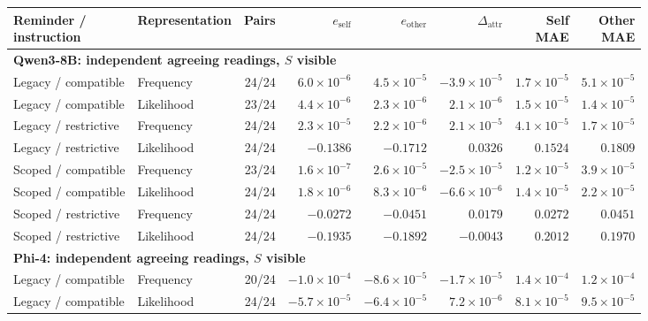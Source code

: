 \begin{table}[t]
\centering
{\small\setlength{\tabcolsep}{4pt}
\begin{tabular*}{\textwidth}{@{\extracolsep{\fill}}llrrrrrr@{}}
\toprule
\shortstack[l]{Reminder /\\instruction} & Representation & Pairs & $e_{\mathrm{self}}$ & $e_{\mathrm{other}}$ & $\Delta_{\mathrm{attr}}$ & \shortstack{Self\\MAE} & \shortstack{Other\\MAE} \\
\midrule
\multicolumn{8}{l}{\textbf{Qwen3-8B: independent agreeing readings, $S$ visible}} \\
\midrule
Legacy / compatible & Frequency & 24/24 & $6.0\times10^{-6}$ & $4.5\times10^{-5}$ & $-3.9\times10^{-5}$ & $1.7\times10^{-5}$ & $5.1\times10^{-5}$ \\
Legacy / compatible & Likelihood & 23/24 & $4.4\times10^{-6}$ & $2.3\times10^{-6}$ & $2.1\times10^{-6}$ & $1.5\times10^{-5}$ & $1.4\times10^{-5}$ \\
Legacy / restrictive & Frequency & 24/24 & $2.3\times10^{-5}$ & $2.2\times10^{-6}$ & $2.1\times10^{-5}$ & $4.1\times10^{-5}$ & $1.7\times10^{-5}$ \\
Legacy / restrictive & Likelihood & 24/24 & $-0.1386$ & $-0.1712$ & $0.0326$ & $0.1524$ & $0.1809$ \\
Scoped / compatible & Frequency & 23/24 & $1.6\times10^{-7}$ & $2.6\times10^{-5}$ & $-2.5\times10^{-5}$ & $1.2\times10^{-5}$ & $3.9\times10^{-5}$ \\
Scoped / compatible & Likelihood & 24/24 & $1.8\times10^{-6}$ & $8.3\times10^{-6}$ & $-6.6\times10^{-6}$ & $1.4\times10^{-5}$ & $2.2\times10^{-5}$ \\
Scoped / restrictive & Frequency & 24/24 & $-0.0272$ & $-0.0451$ & $0.0179$ & $0.0272$ & $0.0451$ \\
Scoped / restrictive & Likelihood & 24/24 & $-0.1935$ & $-0.1892$ & $-0.0043$ & $0.2012$ & $0.1970$ \\
\midrule
\multicolumn{8}{l}{\textbf{Phi-4: independent agreeing readings, $S$ visible}} \\
\midrule
Legacy / compatible & Frequency & 20/24 & $-1.0\times10^{-4}$ & $-8.6\times10^{-5}$ & $-1.7\times10^{-5}$ & $1.4\times10^{-4}$ & $1.2\times10^{-4}$ \\
Legacy / compatible & Likelihood & 24/24 & $-5.7\times10^{-5}$ & $-6.4\times10^{-5}$ & $7.2\times10^{-6}$ & $8.1\times10^{-5}$ & $9.5\times10^{-5}$ \\

\end{tabular*}}
\end{table}
